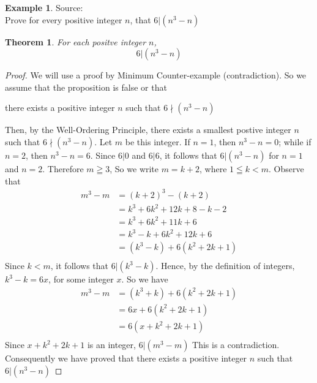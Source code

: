 \documentclass{book}
\newtheorem{theorem}{Theorem}[section]
\theoremstyle{definition}
\newtheorem{example}{Example}[definition]
\theoremstyle{remark}
\begin{document}
\newpage
\begin{example}
Source: \cite[Chap.6, S.6.3, Result 6.16]{gray} \\ 

Prove for every positive integer $n$, that $6 | (n^3 - n)$
    \begin{tcolorbox}
        \begin{theorem}
            For each positve integer $n$,
                \begin{equation*}
                    6 | (n^3 - n)
                \end{equation*}
        \end{theorem}
    \end{tcolorbox}

    \begin{proof}
        We will use a proof by Minimum Counter-example (contradiction). So we assume that the proposition is false or that 
        
        	\begin{center}
        		there exists a positive integer $n$ such that $6 \nmid (n^3 - n)$
        	\end{center}
        
        Then, by the Well-Ordering Principle, there exists a smallest postive integer $n$ such that $6 \nmid (n^3 - n)$. Let $m$ be this integer. If $n=1$, then $n^3-n = 0$; while if $n=2$, then $n^3 - n = 6$. Since $6|0$ and $6|6$, it follows that $6 | (n^3 - n)$ for $n=1$ and $n=2$. Therefore $m \geqq 3$, So we write $m = k + 2$, where $1 \leqq k < m$. Observe that 
            \begin{align*}
                m^3 - m & = (k+2)^3 - (k+2) \\
                    & = k^3 + 6k^2 + 12k + 8 - k - 2 \\
                    & = k^3 +6k^2 + 11k + 6 \\
                    & = k^3 - k +6k^2 + 12k + 6 \\
                    & = (k^3 - k) + 6(k^2 + 2k + 1) \\
            \end{align*}
        Since $k<m$, it follows that $6 | (k^3 - k)$. Hence, by the definition of integers, $k^3 - k = 6x$, for some integer $x$. So we have
            \begin{align*}
                m^3 - m & = (k^3 + k) + 6(k^2 + 2k + 1) \\
                    & = 6x + 6(k^2 + 2k + 1) \\
                    & = 6(x + k^2 + 2k + 1) \\
            \end{align*}
        Since $x + k^2 + 2k + 1$ is an integer, $6 | (m^3 - m)$ This is a contradiction. Consequently we have proved that there exists a positive integer $n$ such that $6 | (n^3 - n)$
    \end{proof}
\end{example}
\end{document}
